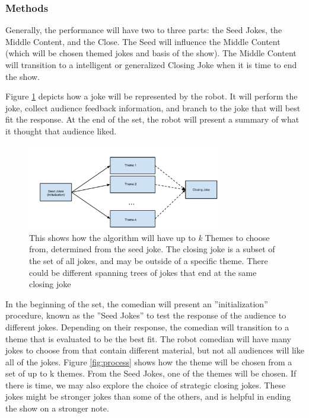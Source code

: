 \documentclass[onecolumn, draftclsnofoot,10pt, compsoc]{IEEEtran}
\begin{document}
\subsubsection{Methods}
Generally, the performance will have two to three parts: the Seed Jokes, the Middle Content, and the Close. The Seed
will influence the Middle Content (which will be chosen themed jokes and basis of the show). The Middle Content will
transition to a intelligent or generalized Closing Joke when it is time to end the show.


Figure \ref{fig:joke} depicts how a joke will be represented by the robot. It will perform the joke, collect audience feedback
information, and branch to the joke that will best fit the response. At the end of the set, the robot will present a summary
of what it thought that audience liked.
\begin{figure}[H]
  \centering
  \includegraphics[width=0.75\textwidth,height=0.75\textheight,keepaspectratio]{fig0}
  \caption{This shows how the algorithm will have up to \textit{k} Themes to choose from, determined from the seed joke. The closing joke is a subset of the set of all jokes, and may be outside of a specific theme. There could be different spanning trees of jokes that end at the same closing joke}
  \label{fig:joke}
\end{figure}

In the beginning of the set, the comedian will present an ”initialization” procedure, known
as the ”Seed Jokes” to test the response of the audience to different jokes. Depending on their response, the comedian
will transition to a theme that is evaluated to be the best fit. The robot comedian will have many jokes to choose from
that contain different material, but not all audiences will like all of the jokes. Figure \ref{fig:process} shows how the theme will be
chosen from a set of up to k themes. From the Seed Jokes, one of the themes will be chosen. If there is time, we may also
explore the choice of strategic closing jokes. These jokes might be stronger jokes than some of the others, and is helpful
in ending the show on a stronger note.
\end{document}
